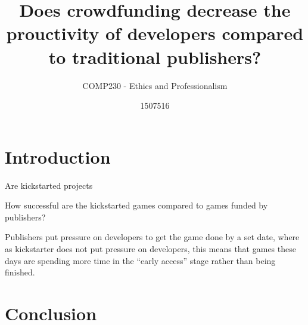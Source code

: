 \documentclass{scrartcl}
\title{Does crowdfunding decrease the prouctivity of developers compared to traditional publishers?}  %
\subtitle{COMP230 - Ethics and Professionalism}
\author{1507516}
\begin{document}
\maketitle


\section{Introduction}

Are kickstarted projects 

How successful are the kickstarted games compared to games funded by publishers?

Publishers put pressure on developers to get the game done by a set date, where as kickstarter does not put pressure on developers, this means that games these days are spending more time in the ``early access'' stage rather than being finished.



\section{}


\section{Conclusion}




\end{document}
